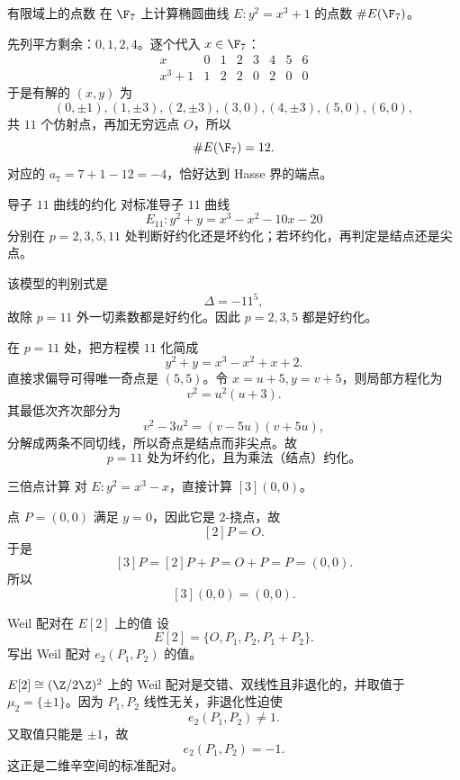 \begin{problem}{有限域上的点数 \easy}
在 $\F_7$ 上计算椭圆曲线 $E:y^2=x^3+1$ 的点数 $\#E(\F_7)$。
\end{problem}
\begin{solution}
先列平方剩余：$0,1,2,4$。逐个代入 $x\in\F_7$：
\[
\begin{array}{c|ccccccc}
x&0&1&2&3&4&5&6\\ \hline
x^3+1&1&2&2&0&2&0&0
\end{array}
\]
于是有解的 $(x,y)$ 为
\[
(0,\pm1),(1,\pm3),(2,\pm3),(3,0),(4,\pm3),(5,0),(6,0),
\]
共 $11$ 个仿射点，再加无穷远点 $O$，所以
\[
\#E(\F_7)=12.
\]
对应的 $a_7=7+1-12=-4$，恰好达到 Hasse 界的端点。
\end{solution}

\begin{problem}{导子 $11$ 曲线的约化 \easy}
对标准导子 $11$ 曲线
\[
E_{11}: y^2+y=x^3-x^2-10x-20
\]
分别在 $p=2,3,5,11$ 处判断好约化还是坏约化；若坏约化，再判定是结点还是尖点。
\end{problem}
\begin{solution}
该模型的判别式是
\[
\Delta=-11^5,
\]
故除 $p=11$ 外一切素数都是好约化。因此 $p=2,3,5$ 都是好约化。

在 $p=11$ 处，把方程模 $11$ 化简成
\[
y^2+y=x^3-x^2+x+2.
\]
直接求偏导可得唯一奇点是 $(5,5)$。令 $x=u+5,y=v+5$，则局部方程化为
\[
v^2=u^2(u+3).
\]
其最低次齐次部分为
\[
v^2-3u^2=(v-5u)(v+5u),
\]
分解成两条不同切线，所以奇点是结点而非尖点。故
\[
p=11\text{ 处为坏约化，且为乘法（结点）约化。}
\]
\end{solution}

\begin{problem}{三倍点计算 \easy}
对 $E:y^2=x^3-x$，直接计算 $[3](0,0)$。
\end{problem}
\begin{solution}
点 $P=(0,0)$ 满足 $y=0$，因此它是 $2$-挠点，故
\[
[2]P=O.
\]
于是
\[
[3]P=[2]P+P=O+P=P=(0,0).
\]
所以
\[
[3](0,0)=(0,0).
\]
\end{solution}

\begin{problem}{Weil 配对在 $E[2]$ 上的值 \easy}
设
\[
E[2]=\{O,P_1,P_2,P_1+P_2\}.
\]
写出 Weil 配对 $e_2(P_1,P_2)$ 的值。
\end{problem}
\begin{solution}
$E[2]\cong (\Z/2\Z)^2$ 上的 Weil 配对是交错、双线性且非退化的，并取值于 $\mu_2=\{\pm1\}$。因为 $P_1,P_2$ 线性无关，非退化性迫使
\[
e_2(P_1,P_2)\neq 1.
\]
又取值只能是 $\pm1$，故
\[
e_2(P_1,P_2)=-1.
\]
这正是二维辛空间的标准配对。
\end{solution}

